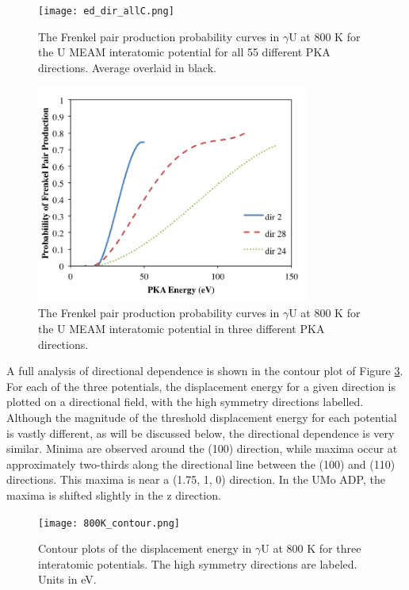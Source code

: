 \documentclass[review]{elsarticle}
\begin{document}
 \begin{figure}[h]
 \centering
 \texttt{[image: ed\_dir\_allC.png]} 
 \caption{The Frenkel pair production probability curves in $\gamma$U at 800 K for the U MEAM interatomic potential for all 55 different PKA directions. Average overlaid in black.}
 \label{fig:ed_dirall}
\end{figure}
 
\begin{figure}[h]
 \centering
 \includegraphics[width=0.8\textwidth]{ed_dirA.png} 
 \caption{The Frenkel pair production probability curves in $\gamma$U at 800 K for the U MEAM interatomic potential in three different PKA directions.}
 \label{fig:ed_dir}
\end{figure}

\FloatBarrier

A full analysis of directional dependence is shown in the contour plot of Figure \ref{fig:800Kcontour}. For each of the three potentials, the displacement energy for a given direction is plotted on a directional field, with the high symmetry directions labelled. Although the magnitude of the threshold displacement energy for each potential is vastly different, as will be discussed below, the directional dependence is very similar. Minima are observed around the (100) direction, while maxima occur at approximately two-thirds along the directional line between the (100) and (110) directions. This maxima is near a (1.75, 1, 0) direction. In the UMo ADP, the maxima is shifted slightly in the z direction. 

\begin{figure}[h]
 \centering
 \texttt{[image: 800K\_contour.png]} 
 \caption{Contour plots of the displacement energy in $\gamma$U at 800 K for three interatomic potentials. The high symmetry directions are labeled. Units in eV.}
 \label{fig:800Kcontour}
\end{figure}
\end{document}
